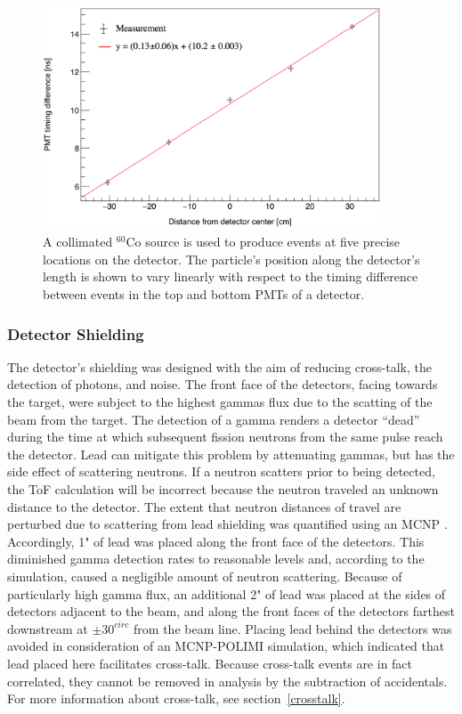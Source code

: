 \begin{figure}
    \centering
    \includegraphics[width = 0.9\textwidth]{Content/Methods/PMTDifference.png}
    \caption{A collimated $^{60}$Co source is used to produce events at five precise locations on the detector.
    The particle's position along the detector's length is shown to vary linearly with respect to the timing difference between events in the top and bottom PMTs of a detector.}
    \label{fig:PMTDifference}
\end{figure}
\subsubsection{Detector Shielding}
The detector's shielding was designed with the aim of reducing cross-talk, the detection of photons, and noise.
The front face of the detectors, facing towards the target, were subject to the highest gammas flux due to the scatting of the beam from the target.
The detection of a gamma renders a detector ``dead'' during the time at which subsequent fission neutrons from the same pulse reach the detector.
Lead can mitigate this problem by attenuating gammas, but has the side effect of scattering neutrons.
If a neutron scatters prior to being detected, the ToF calculation will be incorrect because the neutron traveled an unknown distance to the detector.
The extent that neutron distances of travel are perturbed due to scattering from lead shielding was quantified using an MCNP .
Accordingly, 1" of lead was placed along the front face of the detectors.
This diminished gamma detection rates to reasonable levels and, according to the simulation, caused a negligible amount of neutron scattering.
Because of particularly high gamma flux, an additional 2" of lead was placed at the sides of detectors adjacent to the beam, and along the front faces of the detectors farthest downstream at $\pm30^{circ}$ from the beam line.
Placing lead behind the detectors was avoided in consideration of an MCNP-POLIMI simulation, which indicated that lead placed here facilitates cross-talk.
Because cross-talk events are in fact correlated, they cannot be removed in analysis by the subtraction of accidentals.
For more information about cross-talk, see section~\ref{crosstalk}.

